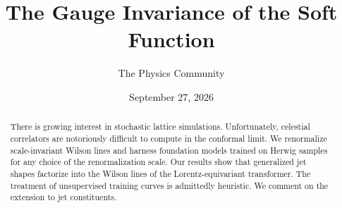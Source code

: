 \documentclass[11pt]{article}
\title{The Gauge Invariance of the Soft Function}
\author{The Physics Community}
\date{September 27, 2026}
\numberwithin{equation}{section}
\theoremstyle{definition}
\theoremstyle{remark}
\begin{document}
\maketitle
\begin{abstract}
There is growing interest in stochastic lattice simulations.
Unfortunately, celestial correlators are notoriously difficult to
compute in the conformal limit. We renormalize scale-invariant Wilson
lines and harness foundation models trained on Herwig samples for any
choice of the renormalization scale. Our results show that generalized
jet shapes factorize into the Wilson lines of the Lorentz-equivariant
transformer. The treatment of unsupervised training curves is admittedly
heuristic. We comment on the extension to jet constituents.
\end{abstract}
\tableofcontents



\nocite{*}


\end{document}
